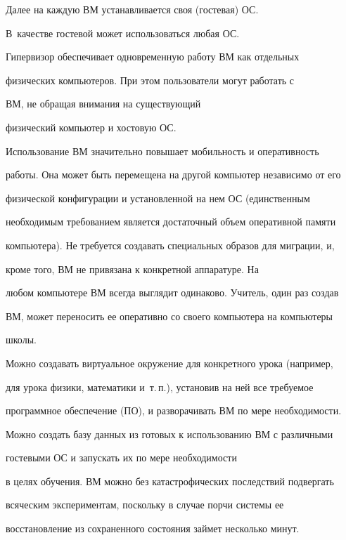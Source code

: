 Далее на каждую ВМ устанавливается своя (гостевая) ОС. 


В~качестве гостевой может использоваться любая ОС.





Гипервизор обеспечивает одновременную работу ВМ как отдельных 


физических компьютеров. При этом пользователи могут работать с 


ВМ, не обращая внимания на существующий 


физический компьютер и хостовую ОС. 





Использование ВМ значительно повышает мобильность и оперативность 


работы. Она может быть перемещена на другой компьютер независимо от его 


физической конфигурации и установленной на нем ОС (единственным 


необходимым требованием является достаточный объем оперативной памяти 


компьютера). Не требуется создавать специальных образов для миграции, и, 


кроме того, ВМ не привязана к конкретной аппаратуре. На 


любом компьютере ВМ всегда выглядит одинаково. Учитель, один раз создав 


ВМ, может переносить ее оперативно со своего компьютера на компьютеры 


школы.





Можно создавать виртуальное окружение для конкретного урока (например, 


для урока физики, математики и~т.\,п.), установив на ней все требуемое 


программное обеспечение (ПО), и разворачивать ВМ по мере необходимости.





Можно создать базу данных из готовых к использованию ВМ с различными 


гостевыми ОС и запускать их по мере необходимости 


в целях обучения. ВМ можно без катастрофических последствий подвергать 


всяческим экспериментам, поскольку в случае порчи системы ее 


восстановление из сохраненного состояния займет несколько минут. 





